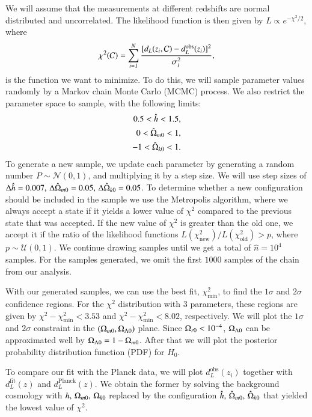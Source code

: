 We will assume that the measurements at different redshifts are normal distributed and uncorrelated. The likelihood function is then given by $L\propto e^{-\chi^2/2}$, where 
\begin{equation}
    \chi^2(\mathcal{C}) = \sum_{i=1}^N \frac{[d_L(z_i, \mathcal{C}) - d_L^\mathrm{obs}(z_i)]^2}{\sigma_i^2}, \label{eq:M1:implementations:chi2_supernova_data}
\end{equation}
is the function we want to minimize. To do this, we will sample parameter values randomly by a Markov chain Monte Carlo (MCMC) process. We also restrict the parameter space to sample, with the following limits:     
\begin{equation} \label{eq:M1:implementations:supernova_parameter_ranges}
    \begin{split}
        0.5 < \hat{h} < 1.5, \\
        0 < \hat{\Omega}_{m0} < 1, \\
        -1 < \hat{\Omega}_{k0} < 1.
    \end{split}
\end{equation}   
To generate a new sample, we update each parameter by generating a random number $P\sim\mathcal{N}(0,1)$, and multiplying it by a step size. We will use step sizes of $\Delta \hat{h} = 0.007,\,\Delta \hat{\Omega}_{m0}=0.05,\,\Delta\hat{\Omega}_{k0}=0.05$. To determine whether a new configuration should be included in the sample we use the Metropolis algorithm, where we always accept a state if it yields a lower value of $\chi^2$ compared to the previous state that was accepted. If the new value of $\chi^2$ is greater than the old one, we accept it if the ratio of the likelihood functions $L(\chi^2_\mathrm{new})/L(\chi^2_\mathrm{old})>p$, where $p\sim\mathcal{U}(0,1)$. We continue drawing samples until we get a total of $\hat{n}=10^4$ samples. For the samples generated, we omit the first $1000$ samples of the chain from our analysis.   

With our generated samples, we can use the best fit, $\chi^2_\mathrm{min}$, to find the $1\sigma$ and $2\sigma$ confidence regions. For the $\chi^2$ distribution with $3$ parameters, these regions are given by $\chi^2 - \chi^2_\mathrm{min}<3.53$ and $\chi^2 - \chi^2_\mathrm{min}<8.02$, respectively. We will plot the $1\sigma$ and $2\sigma$ constraint in the $(\Omega_{m0},\Omega_{\Lambda 0})$ plane. Since $\Omega_{r0}<10^{-4}$, $\Omega_{\Lambda 0}$ can be approximated well by $\Omega_{\Lambda 0}=1-\Omega_{m0}$. After that we will plot the posterior probability distribution function (PDF) for $H_0$. 

To compare our fit with the Planck data, we will plot $d_L^\mathrm{obs}(z_i)$ together with $d_L^\mathrm{fit}(z)$ and $d_L^\mathrm{Planck}(z)$. We obtain the former by solving the background cosmology with $h,\,\Omega_{m0},\,\Omega_{k0}$ replaced by the configuration $\hat{h},\,\hat{\Omega}_{m0},\,\hat{\Omega}_{k0}$ that yielded the lowest value of $\chi^2$.     



